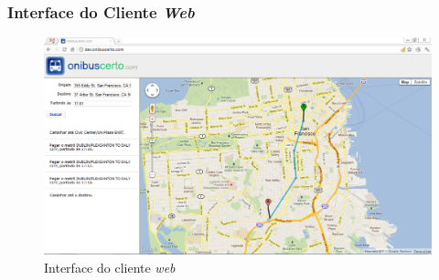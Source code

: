 \frame
{
\frametitle{Interface do Cliente \emph{Web}}
\begin{figure}
\includegraphics[width=1\textwidth]{./imgs/clienteweb.png}
\caption{Interface do cliente \emph{web}}
\end{figure}
}